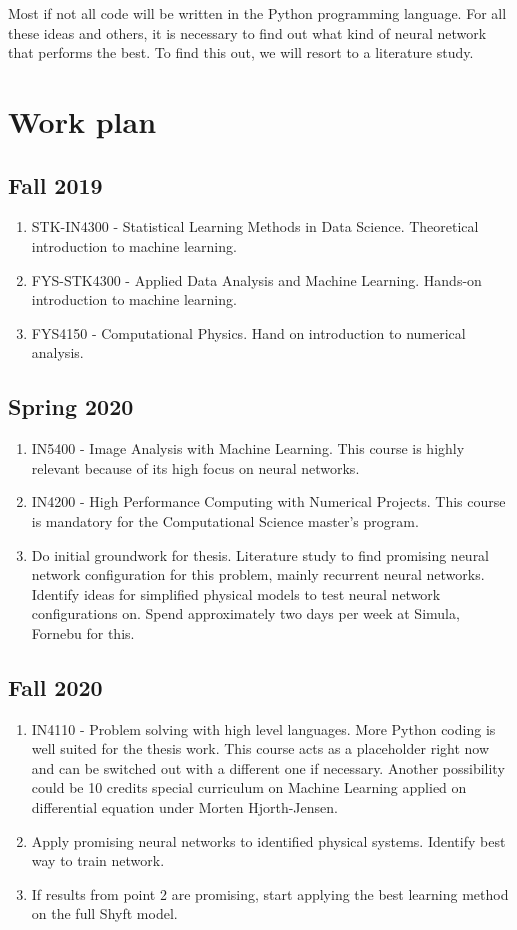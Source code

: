 \documentclass[a4paper,12pt,english]{article}
\begin{document}
Most if not all code will be written in the Python programming language. For all these ideas and others, it is necessary to find out what kind of neural network that performs the best. To find this out, we will resort to a literature study. 
\section{Work plan}
\subsection{Fall 2019}
\begin{enumerate}
\item STK-IN4300 - Statistical Learning Methods in Data Science. Theoretical introduction to machine learning.
\item FYS-STK4300 - Applied Data Analysis and Machine Learning. Hands-on introduction to machine learning.
\item FYS4150 - Computational Physics. Hand on introduction to numerical analysis. 
\end{enumerate}
\subsection{Spring 2020}
\begin{enumerate}
\item IN5400 - Image Analysis with Machine Learning. This course is highly relevant because of its high focus on neural networks.
\item IN4200 - High Performance Computing with Numerical Projects. This course is mandatory for the Computational Science master's program.
\item Do initial groundwork for thesis. Literature study to find promising neural network configuration for this problem, mainly recurrent neural networks. Identify ideas for simplified physical models to test neural network configurations on. Spend approximately two days per week at Simula, Fornebu for this.
\end{enumerate}
\subsection{Fall 2020}
\begin{enumerate}
\item IN4110 - Problem solving with high level languages. More Python coding is well suited for the thesis work. This course acts as a placeholder right now and can be switched out with a different one if necessary. Another possibility could be 10 credits special curriculum on Machine Learning applied on differential equation under Morten Hjorth-Jensen.
\item Apply promising neural networks to identified physical systems. Identify best way to train network.
\item If results from point 2 are promising, start applying the best learning method on the full Shyft model.
\end{enumerate}
\end{document}
